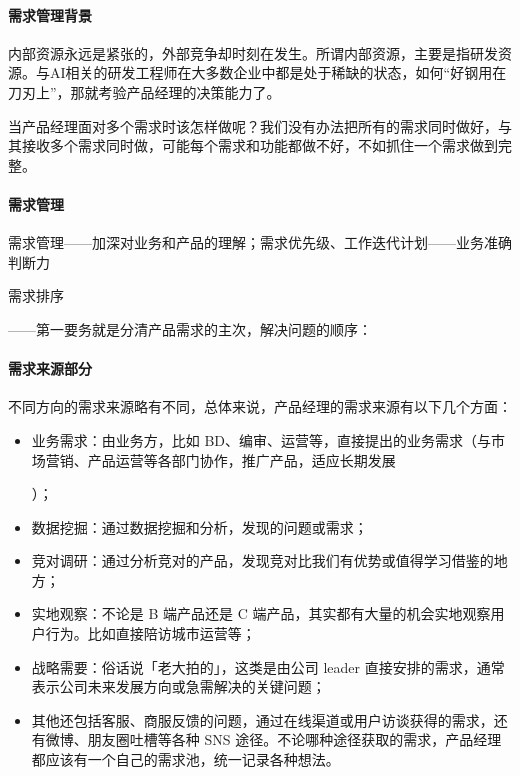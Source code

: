 \documentclass[letterpaper,10pt,english]{sphinxmanual}
\begin{document}
\paragraph{需求管理背景}
\label{\detokenize{chapter_knowledge/upgrade_manage:id8}}
内部资源永远是紧张的，外部竞争却时刻在发生。所谓内部资源，主要是指研发资源。与AI相关的研发工程师在大多数企业中都是处于稀缺的状态，如何“好钢用在刀刃上”，那就考验产品经理的决策能力了。

当产品经理面对多个需求时该怎样做呢？我们没有办法把所有的需求同时做好，与其接收多个需求同时做，可能每个需求和功能都做不好，不如抓住一个需求做到完整。


\paragraph{需求管理}
\label{\detokenize{chapter_knowledge/upgrade_manage:id9}}
需求管理——加深对业务和产品的理解；需求优先级、工作迭代计划——业务准确判断力

需求排序
%
\begin{footnote}[673]\sphinxAtStartFootnote
{}
%
\end{footnote}——第一要务就是分清产品需求的主次，解决问题的顺序：


\paragraph{需求来源部分}
\label{\detokenize{chapter_knowledge/upgrade_manage:id10}}
不同方向的需求来源略有不同，总体来说，产品经理的需求来源有以下几个方面：
\begin{itemize}
\item {} 
业务需求：由业务方，比如
BD、编审、运营等，直接提出的业务需求（与市场营销、产品运营等各部门协作，推广产品，适应长期发展%
\begin{footnote}[674]\sphinxAtStartFootnote
{}
%
\end{footnote}）；

\item {} 
数据挖掘：通过数据挖掘和分析，发现的问题或需求；

\item {} 
竞对调研：通过分析竞对的产品，发现竞对比我们有优势或值得学习借鉴的地方；

\item {} 
实地观察：不论是 B 端产品还是 C
端产品，其实都有大量的机会实地观察用户行为。比如直接陪访城市运营等；

\item {} 
战略需要：俗话说「老大拍的」，这类是由公司 leader
直接安排的需求，通常表示公司未来发展方向或急需解决的关键问题；

\item {} 
其他还包括客服、商服反馈的问题，通过在线渠道或用户访谈获得的需求，还有微博、朋友圈吐槽等各种
SNS
途径。不论哪种途径获取的需求，产品经理都应该有一个自己的需求池，统一记录各种想法。

\end{itemize}
\end{document}
